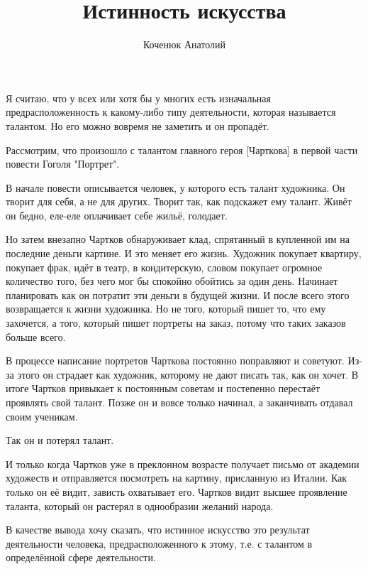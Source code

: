 \documentclass[10pt,a4paper]{article}
\author{Коченюк Анатолий}
\title{Истинность искусства}
\begin{document}
  	\maketitle

  
  Я считаю, что у всех или хотя бы у многих есть изначальная предрасположенность к какому-либо типу деятельности, которая называется талантом. Но его можно вовремя не заметить и он пропадёт.
   

  
  Рассмотрим, что произошло с талантом главного героя [Чарткова]  в первой части повести Гоголя "Портрет".
  
  В начале повести описывается человек, у которого есть талант художника. Он творит для себя, а не для других. Творит так, как подскажет ему талант. Живёт он бедно, еле-еле оплачивает себе жильё, голодает.
  
  Но затем внезапно Чартков обнаруживает клад, спрятанный в купленной им на последние деньги картине. И это меняет его жизнь. Художник покупает квартиру, покупает фрак, идёт в театр, в кондитерскую, словом покупает огромное количество того, без чего мог бы спокойно обойтись за один день. Начинает планировать как он потратит эти деньги в будущей жизни. И после всего этого возвращается к жизни художника. Но не того, который пишет то, что ему захочется, а того, который пишет портреты на заказ, потому что таких заказов  больше всего.
  
  В процессе написание портретов Чарткова постоянно поправляют и советуют. Из-за этого он страдает как художник, которому не дают писать так, как он хочет. В итоге Чартков привыкает к постоянным советам и постепенно перестаёт проявлять свой талант. Позже он и вовсе только начинал, а заканчивать отдавал своим ученикам.
  
  Так он и потерял талант.
  
  И только когда Чартков уже в преклонном возрасте получает письмо от академии художеств и отправляется посмотреть на картину, присланную из Италии. Как только он её видит, зависть охватывает его. Чартков видит высшее проявление таланта, который он растерял в однообразии желаний народа. 
  
  В качестве вывода хочу сказать, что истинное искусство это результат деятельности человека, предрасположенного к этому, т.е. с талантом в определённой сфере деятельности.
  
  
  	
  
\end{document}
